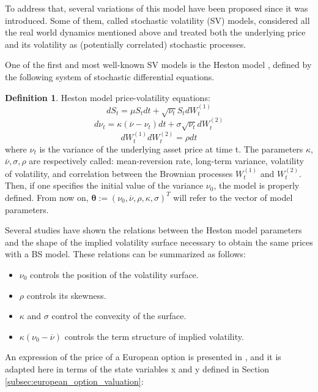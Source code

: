 \documentclass[12,twoside]{mammeTFM}
\theoremstyle{definition}
\newtheorem{definition}[thm]{Definition}
\theoremstyle{remark}
\begin{document}
To address that, several variations of this model have been proposed since it was introduced. Some of them, called stochastic volatility (SV) models, considered all the real world dynamics mentioned above and treated both the underlying price and its volatility as (potentially correlated) stochastic processes.

One of the first and most well-known SV models is the Heston model \cite{Heston1993}, defined by the following system of stochastic differential equations.

\begin{definition} Heston model price-volatility equations:
$$
dS_t = \mu S_t dt + \sqrt{\nu_t} S_t dW_t^{(1)}
$$
$$
d\nu_t = \kappa(\overline{\nu} - \nu_t) dt + \sigma \sqrt{\nu_t}dW_t^{(2)}
$$
$$
dW_t^{(1)}dW_t^{(2)} = \rho dt
$$
where $\nu_t$ is the variance of the underlying asset price at time t. The parameters $\kappa$, $\overline{\nu}, \sigma, \rho$ are respectively called: mean-reversion rate, long-term variance, volatility of volatility, and correlation between the Brownian processes $W_t^{(1)}$ and $W_t^{(2)}$. Then, if one specifies the initial value of the variance $\nu_0$, the model is properly defined. From now on, $\boldsymbol{\theta} := (\nu_0, \overline{\nu}, \rho, \kappa, \sigma)^T$ will refer to the vector of model parameters.
\end{definition}

Several studies have shown the relations between the Heston model parameters and the shape of the implied volatility surface \cite{cla11, gat06, gil12, jan11} necessary to obtain the same prices with a BS model. These relations can be summarized as follows:

\begin{itemize} \label{hes_param_properties}
\item $\nu_0$ controls the position of the volatility surface.
\item $\rho$ controls its skewness.
\item $\kappa$ and $\sigma$ control the convexity of the surface.
\item $\kappa(\nu_0 - \overline{\nu})$ controls the term structure of implied volatility.
\end{itemize}

An expression of the price of a European option is presented in \cite{Heston1993}, and it is adapted here in terms of the state variables x and y defined in Section \ref{subsec:european_option_valuation}:
\end{document}
